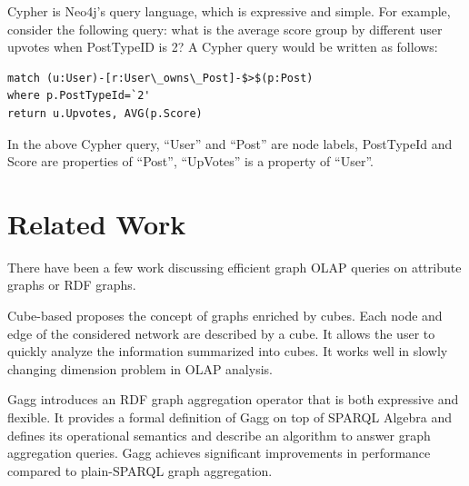 Cypher is Neo4j’s query language, which is expressive and simple. For example, consider the following query: what is the average score group by different user upvotes when PostTypeID is 2? A Cypher query would be written as follows:

\begin{verbatim}
match (u:User)-[r:User\_owns\_Post]-$>$(p:Post)
where p.PostTypeId=`2'
return u.Upvotes, AVG(p.Score)
\end{verbatim}

In the above Cypher query, ``User'' and ``Post'' are node labels, PostTypeId and Score are properties of ``Post'', ``UpVotes'' is a property of ``User''.


%


\section{Related Work}

There have been a few work discussing efficient graph OLAP queries on attribute graphs or RDF graphs.

Cube-based \cite{DBLP:conf/sofsem/JakawatFL16} proposes the concept of  graphs enriched by cubes. Each node and edge of the considered network are described by a cube. It allows the user to quickly analyze the information summarized into cubes. It works well in slowly changing dimension problem in OLAP analysis.

Gagg \cite{DBLP:conf/esws/MaaliCD15} introduces an RDF graph aggregation operator that is both expressive and flexible. It provides a formal definition of Gagg on top of SPARQL Algebra and defines its operational semantics and describe an algorithm to answer graph aggregation queries. Gagg achieves significant improvements in performance compared to plain-SPARQL graph aggregation.

